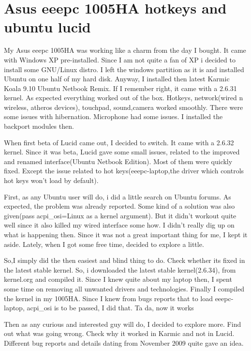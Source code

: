 \section*{Asus eeepc 1005HA hotkeys and ubuntu lucid}
\vskip 2pt

My Asus eeepc 1005HA was working like a charm from the day I bought. It came with Windows XP pre-installed. Since I am not quite a fan of XP i decided to install some GNU/Linux distro. I left the windows partition as it is and installed Ubuntu on one half of my hard disk. Anyway, I installed then latest Karmic Koala 9.10 Ubuntu Netbook Remix. If I remember right, it came with a 2.6.31 kernel. As expected everything worked out of the box. Hotkeys, network(wired n wireless, atheros devices), touchpad, sound,camera worked smoothly. There were some issues with hibernation. Microphone had some issues. I installed the backport modules then.

When first beta of Lucid came out, I decided to switch. It came with a 2.6.32 kernel. Since it was beta, Lucid gave some small issues, related to the improved and renamed interface(Ubuntu Netbook Edition). Most of them were quickly fixed. Except the issue related to hot keys(eeepc-laptop,the driver which controls hot keys won’t load by default).

First, as any Ubuntu user will do, i did a little search on Ubuntu forums. As expected, the problem was already reported. Some kind of a solution was also given(pass acpi_osi=Linux as a kernel argument). But it didn’t workout quite well since it also killed my wired interface some how. I didn’t really dig up on what is happening then. Since it was not a great important thing for me, I kept it aside. Lately, when I got some free time, decided to explore a little.

So,I simply did the then easiest and blind thing to do. Check whether its fixed in the latest stable kernel. So, i downloaded the latest stable kernel(2.6.34), from kernel.org and compiled it. Since I knew quite about my laptop then, I spent some time on removing all unwanted drivers and technologies. Finally I compiled the kernel in my 1005HA. Since I knew from bugs reports that to load eeepc-laptop, acpi_osi is to be passed, I did that. Ta da, now it works 

Then as any curious and interested guy will do, I decided to explore more. Find out what was going wrong. Check why it worked in Karmic and not in Lucid. Different bug reports and details dating from November 2009 quite gave an idea.


